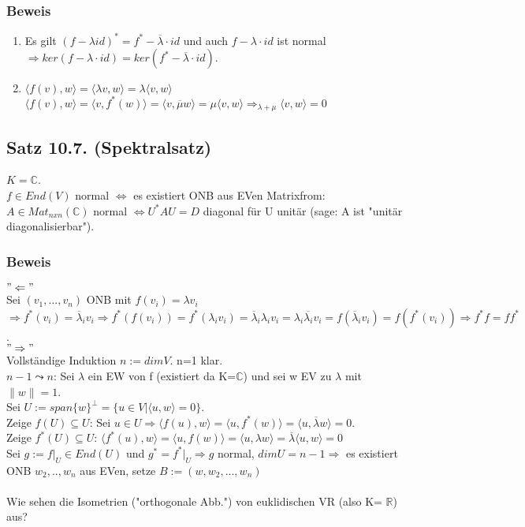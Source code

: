 \documentclass[a4paper, 12pt]{extarticle}
\newcommand{\norm}[1]{
	\parallel #1 \parallel
}
\newcommand{\skalar}[2] {
	\langle #1, #2\rangle
}
\newcommand{\gdw}{\Leftrightarrow}
\begin{document}
\subsubsection*{Beweis}
\begin{enumerate}[label=\alph*)]
	\item Es gilt $(f-\lambda id)^*=f^*-\overline\lambda\cdot id$ und auch $f-\lambda\cdot id$ ist normal $\Rightarrow ker(f-\lambda\cdot id) = ker(f^*-\overline\lambda\cdot id)$.
	\item $\skalar{f(v)}{w} = \skalar{\lambda v}{w} = \lambda\skalar{v}{w}$ \\
	$\skalar{f(v)}{w} = \skalar{v}{f^*(w)} = \skalar{v}{\overline\mu w} = \mu\skalar{v}{w} \Rightarrow_{\lambda + \mu} \skalar{v}{w} = 0$
\end{enumerate}
\subsection*{Satz 10.7. (Spektralsatz)}
$K=\mathbb C$. \\
$f\in End(V)$ normal $\gdw$ es existiert ONB aus EVen Matrixfrom: $A \in Mat_{nxn}(\mathbb C)$ normal $\gdw U^*AU = D$ diagonal für U unitär (sage: A ist "unitär diagonalisierbar").
\subsubsection*{Beweis}
$"\Leftarrow"$ \\
Sei $(v_1,...,v_n)$ ONB mit $f(v_i) = \lambda v_i$ $\Rightarrow f^*(v_i) = \overline\lambda_iv_i \Rightarrow f^*(f(v_i)) = f^*(\lambda_iv_i) = \overline\lambda_i\lambda_iv_i = \lambda_i\overline{\lambda_i}v_i = f(\overline\lambda_iv_i) = f(f^*(v_i)) \Rightarrow f^*f = ff^*$. \\
$"\Rightarrow"$ \\
Vollständige Induktion $n:=dimV$. n=1 klar. \\
$n-1 \leadsto n$: Sei $\lambda$ ein EW von f (existiert da K=$\mathbb C$) und sei w EV zu $\lambda$ mit $\norm w = 1$. \\
Sei $U:=span\{w\}^\perp = \{u\in V|\skalar{u}{w}=0\}$. \\
Zeige $f(U)\subseteq U$: Sei $u\in U \Rightarrow \skalar{f(u)}{w} = \skalar{u}{f^{*}(w)} = \skalar{u}{\overline\lambda w} = 0$. \\
Zeige $f^*(U) \subseteq U$: $\skalar{f^*(u)}{w} = \skalar{u}{f(w)} = \skalar{u}{\lambda w} = \overline\lambda\skalar{u}{w} = 0$ \\
Sei $g:= f|_U \in End(U)$ und $g^*=f^*|_U \Rightarrow g$ normal, $dim U = n-1 \Rightarrow$ es existiert ONB $w_2,..,w_n$ aus EVen, setze $B:=(w,w_2,...,w_n)$ \\ \\
Wie sehen die Isometrien ("orthogonale Abb.") von euklidischen VR (also K= $\mathbb R$) aus?
\end{document}
